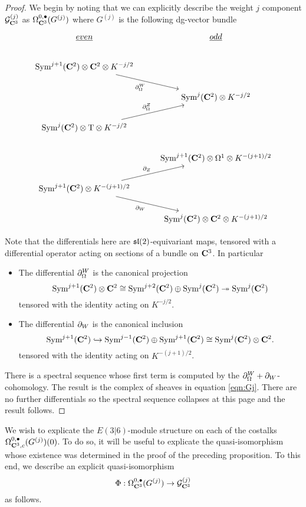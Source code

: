 \documentclass[../main.tex]{subfiles}
\begin{document}
\begin{proof}
We begin by noting that we can explicitly describe the weight $j$ component $\mathcal{G}^{(j)}_{\mathbf{C}^3}$ as $\Omega^{0,\bullet}_{\mathbf{C}^3} (G^{(j)})$ where $G^{(j)}$ is the following dg-vector bundle
\begin{equation}
\begin{tikzcd}
\ul{even} & \ul{odd} \\
\Sym^{j+1}(\C^2) \otimes \C^2 \ar[dr, "\del^W_\Omega"'] \otimes K^{-j/2}\\ 
& \Sym^j (\C^2) \otimes K^{-j/2} \\ 
\Sym^j (\C^2) \otimes  \T \otimes K^{-j/2} \ar[ur, "\del^Z_\Omega"]  & \\
& \Sym^{j+1}(\C^2)  \otimes  \Omega^1 \otimes K^{-(j+1)/2} \\ 
\Sym^{j+1}(\C^2) \otimes K^{-(j+1)/2} \ar[ur, "\del_Z"] \ar[dr, "\del_W"'] \\
& \Sym^j(\C^2) \otimes \C^2\otimes K^{-(j+1)/2} 
\end{tikzcd}
\end{equation}

Note that the differentials here are $\mathfrak{sl}(2)$-equivariant maps, tensored with a differential operator acting on sections of a bundle on $\mathbf{C}^3$. In particular

\begin{itemize}
\item The differential $\partial^W_\Omega$ is the canonical projection \[\text{Sym}^{j+1}(\mathbf{C}^2) \otimes \mathbf{C}^2 \cong \text{Sym}^{j+2} (\mathbf{C}^2) \oplus \text{Sym} ^j (\mathbf{C}^2) \twoheadrightarrow \text{Sym}^j (\mathbf{C}^2)\] tensored with the identity acting on $K^{-j/2}$. 

\item The differential $\partial_W$ is the canonical inclusion \[\text{Sym}^{j+1}(\mathbf{C}^2) \hookrightarrow \text{Sym}^{j-1}(\mathbf{C}^2) \oplus \text{Sym}^{j+1}(\mathbf{C}^2) \cong \text{Sym}^j(\mathbf{C}^2) \otimes \mathbf{C}^2 .\] tensored with the identity acting on $K^{-(j+1)/2}$.
\end{itemize}

There is a spectral sequence whose first term is computed by the $\partial^W_\Omega +\partial_W$-cohomology. The result is the complex of sheaves in equation \ref{eqn:Gj}. There are no further differentials so the spectral sequence collapses at this page and the result follows.
\end{proof}

\iffalse
\parsec[]
We wish to explicate the $E(3|6)$-module structure on each of the costalks $\Omega^{0,\bullet}_{\mathbf{C}^3, c} (G^{(j)} )(0)$. To do so, it will be useful to explicate the quasi-isomorphism whose existence was determined in the proof of the preceding proposition. To this end, we describe an explicit quasi-isomorphism 
\[\Phi: \Omega^{0,\bullet}_{\mathbf{C}^3} (G^{(j)} ) \to \mathcal{G}^{(j)}_{\mathbf{C}^3}\] 
as follows. 
\end{document}
